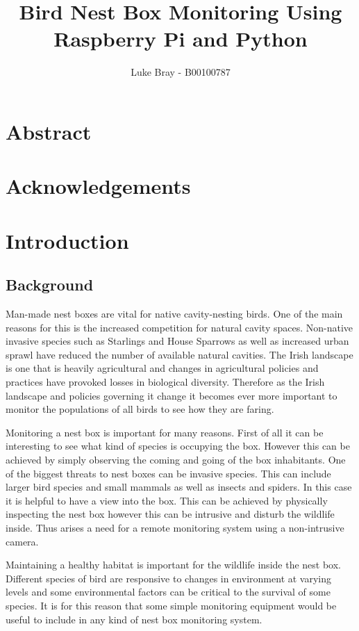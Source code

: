 \documentclass[10pt,a4paper]{article}
\author{Luke Bray - B00100787}
\title{Bird Nest Box Monitoring Using Raspberry Pi and Python}
\begin{document}

\pagebreak
\section{Abstract}
\pagebreak
\section{Acknowledgements}
\pagebreak
\tableofcontents
\pagebreak
\listoffigures
\pagebreak
\listoftables
\pagebreak
\section{Introduction}
\subsection{Background}
Man-made nest boxes are vital for native cavity-nesting birds. One of the main reasons for this is the increased competition for natural cavity spaces. Non-native invasive species such as Starlings and House Sparrows as well as increased urban sprawl have reduced the number of available natural cavities. The Irish landscape is one that is heavily agricultural and changes in agricultural policies and practices have provoked losses in biological diversity\cite{PIERRET201814}. Therefore as the Irish landscape and policies governing it change it becomes ever more important to monitor the populations of all birds to see how they are faring\cite{website:birdwatchireland}. 

Monitoring a nest box is important for many reasons. First of all it can be interesting to see what kind of species is occupying the box. However this can be achieved by simply observing the coming and going of the box inhabitants. One of the biggest threats to nest boxes can be invasive species. This can include larger bird species and small mammals as well as insects and spiders. In this case it is helpful to have a view into the box. This can be achieved by physically inspecting the nest box however this can be intrusive and disturb the wildlife inside. Thus arises a need for a remote monitoring system using a non-intrusive camera. 

Maintaining a healthy habitat is important for the wildlife inside the nest box. Different species of bird are responsive to changes in environment at varying levels and some environmental factors can be critical to the survival of some species\cite{wormworth06}. It is for this reason that some simple monitoring equipment would be useful to include in any kind of nest box monitoring system.
\end{document}
